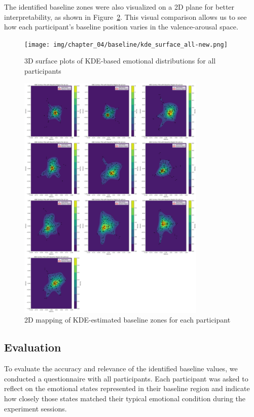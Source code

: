 The identified baseline zones were also visualized on a 2D plane for better interpretability, as shown in Figure~\ref{fig:kde-2d-baselines}. This visual comparison allows us to see how each participant's baseline position varies in the valence-arousal space.

\begin{figure}[H]
    \centering
    \texttt{[image: img/chapter\_04/baseline/kde\_surface\_all-new.png]}
    \caption{3D surface plots of KDE-based emotional distributions for all participants}
    \label{fig:kde-3d-plots}
\end{figure}


\begin{figure}[H]
    \centering
    \includegraphics[width=0.80\textwidth]{img/chapter_04/baseline/kde_2d_baseline_map-new.png}
    \caption{2D mapping of KDE-estimated baseline zones for each participant}
    \label{fig:kde-2d-baselines}
\end{figure}


\subsection*{Evaluation}

To evaluate the accuracy and relevance of the identified baseline values, we conducted a questionnaire with all participants. Each participant was asked to reflect on the emotional states represented in their baseline region and indicate how closely those states matched their typical emotional condition during the experiment sessions.

